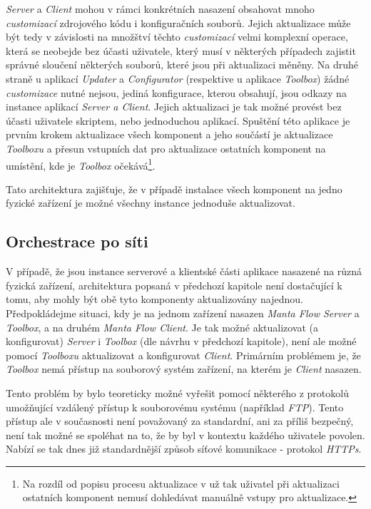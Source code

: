 \textit{Server} a \textit{Client} mohou v rámci konkrétních nasazení obsahovat mnoho \textit{customizací} zdrojového kódu i konfiguračních souborů. Jejich aktualizace může být tedy v závislosti na množštví těchto \textit{customizací} velmi komplexní operace, která se neobejde bez účasti uživatele, který musí v některých případech zajistit správné sloučení některých souborů, které jsou při aktualizaci měněny. Na druhé straně u aplikací \textit{Updater} a \textit{Configurator} (respektive u aplikace \textit{Toolbox}) žádné \textit{customizace} nutné nejsou, jediná konfigurace, kterou obsahují, jsou odkazy na instance aplikací \textit{Server a Client}. Jejich aktualizaci je tak možné provést bez účasti uživatele skriptem, nebo jednoduchou aplikací. Spuštění této aplikace je prvním krokem aktualizace všech komponent a jeho součástí je aktualizace \textit{Toolboxu} a přesun vstupních dat pro aktualizace ostatních komponent na umístění, kde je \textit{Toolbox} očekává\footnote{Na rozdíl od popisu procesu aktualizace v \cite{Gondek16} už tak uživatel při aktualizaci ostatních komponent nemusí dohledávat manuálně vstupy pro aktualizace.}.

Tato architektura zajišťuje, že v případě instalace všech komponent na jedno fyzické zařízení je možné všechny instance jednoduše aktualizovat.

\subsection{Orchestrace po síti}
\label{sec:des_orchestration_multinode}
V případě, že jsou instance serverové a klientské části aplikace nasazené na různá fyzická zařízení, architektura popsaná v předchozí kapitole není dostačující k tomu, aby mohly být obě tyto komponenty aktualizovány najednou.
Předpokládejme situaci, kdy je na jednom zařízení nasazen \textit{Manta Flow Server} a \textit{Toolbox}, a na druhém \textit{Manta Flow Client}. Je tak možné aktualizovat (a konfigurovat) \textit{Server} i \textit{Toolbox} (dle návrhu v předchozí kapitole), není ale možné pomocí \textit{Toolboxu} aktualizovat a konfigurovat \textit{Client}. Primárním problémem je, že \textit{Toolbox} nemá přístup na souborový systém zařízení, na kterém je \textit{Client} nasazen.

Tento problém by bylo teoreticky možné vyřešit pomocí některého z protokolů umožňující vzdálený přístup k souborovému systému (například \textit{FTP}). Tento přístup ale v současnosti není považovaný za standardní, ani za příliš bezpečný, není tak možné se spoléhat na to, že by byl v kontextu každého uživatele povolen. Nabízí se tak dnes již standardnější způsob síťové komunikace - protokol \textit{HTTPs}.

